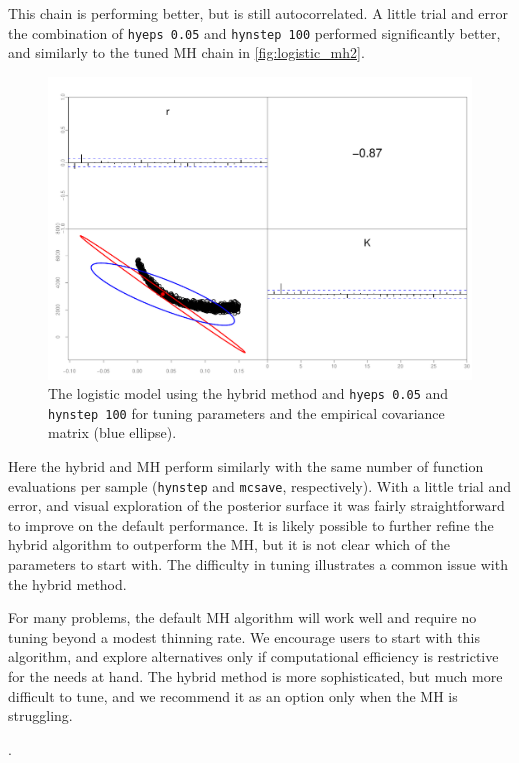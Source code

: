 \documentclass{article}\usepackage[]{graphicx}\usepackage[]{color}
\begin{document}
This chain is performing better, but is still
autocorrelated. A little trial and error the combination of
\texttt{hyeps 0.05} and \texttt{hynstep 100} performed
significantly better, and similarly to the tuned MH chain in
\ref{fig:logistic_mh2}.
\begin{figure}[H]
  \centering
  \includegraphics[width=5in]{../plots/logistic_hy3.pdf}
  \caption{The logistic model using the hybrid method and
    \texttt{hyeps 0.05} and \texttt{hynstep 100} for tuning
    parameters and the empirical covariance matrix (blue
    ellipse).}
  \label{fig:logistic_hy3}
\end{figure}

Here the hybrid and MH perform similarly with the same
number of function evaluations per sample (\texttt{hynstep}
and \texttt{mcsave}, respectively). With a little trial and
error, and visual exploration of the posterior surface it
was fairly straightforward to improve on the default
performance. It is likely possible to further refine the
hybrid algorithm to outperform the MH, but it is not clear
which of the parameters to start with. The difficulty in
tuning illustrates a common issue with the hybrid method.

For many problems, the default MH algorithm will work well
and require no tuning beyond a modest thinning rate. We
encourage users to start with this algorithm, and explore
alternatives only if computational efficiency is restrictive
for the needs at hand. The hybrid method is more
sophisticated, but much more difficult to tune, and we
recommend it as an option only when the MH is struggling.

\newpage

.
\end{document}
